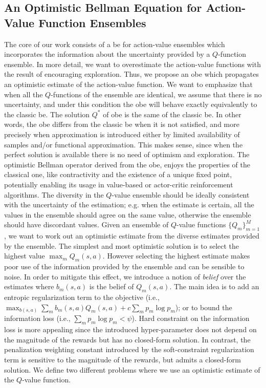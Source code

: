 \subsection{An Optimistic Bellman Equation for Action-Value Function Ensembles}
The core of our work consists of a \gls{be} for action-value ensembles which incorporates the information about the uncertainty provided by a $Q$-function ensemble.
In more detail, we want to overestimate the action-value functions with the result of encouraging exploration.   
Thus, we propose an \gls{obe} which propagates an optimistic estimate of the action-value function. 
We want to emphasize that when all the $Q$-functions of the ensemble are identical, we assume that there is no uncertainty, and under this condition the \gls{obe} will behave exactly equivalently to the classic \gls{be}. The solution $Q^*$ of \gls{obe} is the same of the classic \gls{be}. In other words, the \gls{obe} differs from the classic \gls{be} when it is not satisfied, and more precisely when approximation is introduced either by limited availability of samples and/or functional approximation. This makes sense, since when the perfect solution is available there is no need of optimism and exploration. 
The optimistic Bellman operator derived from the \gls{obe}, enjoys the properties of the classical one, like contractivity and the existence of a unique fixed point, potentially enabling its usage in value-based or actor-critic reinforcement algorithms. 
The diversity in the $Q$-value ensemble should be ideally consistent with the uncertainty of the estimation; e.g. when the estimate is certain, all the values in the ensemble should agree on the same value, otherwise the ensemble should have discordant values.
Given an ensemble of $Q$-value functions $\{Q_m\}_{m=1}^M$, we want to work out an optimistic estimate from the diverse estimates provided by the ensemble. The simplest and most optimistic solution is to select the highest value $\max_m Q_m(s,a)$.
However selecting the highest estimate makes poor use of the information provided by the ensemble and can be sensible to noise. In order to mitigate this effect, we introduce a notion of \textit{belief} over the estimates where $b_m(s,a)$ is the belief of $Q_m(s,a)$. The main idea is to add an entropic regularization term to the objective (i.e., $\max_{b(s,a)} \sum_m b_m(s,a) Q_m(s,a) + c \sum_{m} p_m \log p_m $); or to bound the information loss (i.e., $\sum_m p_m \log p_m < \psi$). Hard constraint on the information loss is more appealing since the introduced hyper-parameter does not depend on the magnitude of the rewards but has no closed-form solution. In contrast, the penalization weighting constant introduced by the soft-constraint regularization term is sensitive to the magnitude of the rewards, but admits a closed-form solution.
We define two different problems where we use an optimistic estimate of the $Q$-value function.

